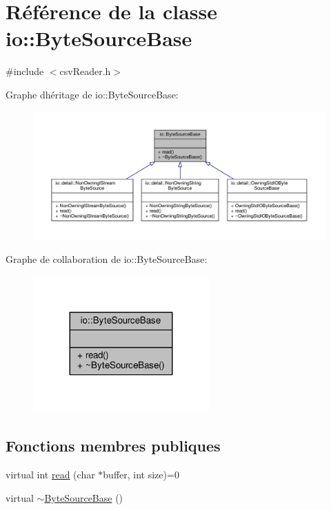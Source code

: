 \hypertarget{classio_1_1ByteSourceBase}{}\section{Référence de la classe io\+:\+:Byte\+Source\+Base}
\label{classio_1_1ByteSourceBase}


{\ttfamily \#include $<$csv\+Reader.\+h$>$}



Graphe d\textquotesingle{}héritage de io\+:\+:Byte\+Source\+Base\+:\nopagebreak
\begin{figure}[H]
\begin{center}
\leavevmode
\includegraphics[width=350pt]{classio_1_1ByteSourceBase__inherit__graph}
\end{center}
\end{figure}


Graphe de collaboration de io\+:\+:Byte\+Source\+Base\+:\nopagebreak
\begin{figure}[H]
\begin{center}
\leavevmode
\includegraphics[width=191pt]{classio_1_1ByteSourceBase__coll__graph}
\end{center}
\end{figure}
\subsection*{Fonctions membres publiques}
\begin{DoxyCompactItemize}
\item 
virtual int \hyperlink{classio_1_1ByteSourceBase_a9598bcc869b79e44da07f0e6fa478615}{read} (char $\ast$buffer, int size)=0
\item 
virtual \hyperlink{classio_1_1ByteSourceBase_ac3228fe608b3268e49c2243d668d6efd}{$\sim$\+Byte\+Source\+Base} ()
\end{DoxyCompactItemize}


